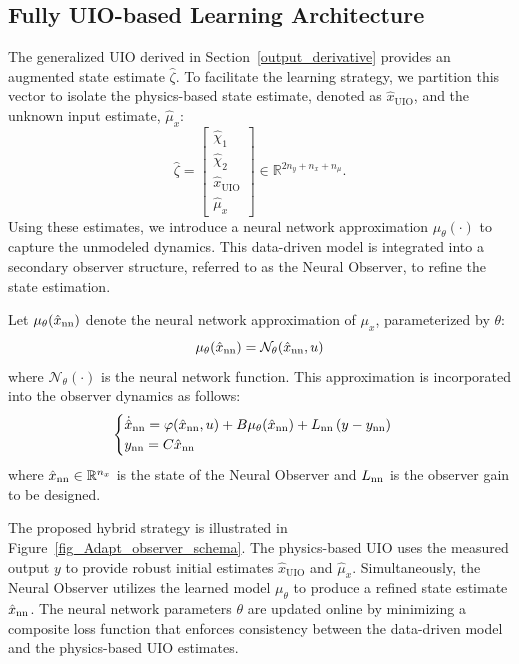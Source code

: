 \subsection{Fully UIO-based Learning Architecture}\label{learning_uio}
The generalized UIO derived in Section~\ref{output_derivative} provides an augmented state estimate $\hat{\zeta}$. To facilitate the learning strategy, we partition this vector to isolate the physics-based state estimate, denoted as $\hat{x}_{\text{UIO}}$, and the unknown input estimate, $\hat{\mu}_x$:
\begin{equation}
    \hat{\zeta} = \begin{bmatrix} \hat{\chi}_1 \\ \hat{\chi}_2 \\ \hat{x}_{\text{UIO}} \\ \hat{\mu}_x \end{bmatrix} \in \mathbb{R}^{2n_y + n_x + n_\mu}.
\end{equation}
Using these estimates, we introduce a neural network approximation $\mu_{\theta}(\cdot)$ to capture the unmodeled dynamics. This data-driven model is integrated into a secondary observer structure, referred to as the Neural Observer, to refine the state estimation.

Let $\mu_{\theta}(\hat{x}_{\text{nn}})$ denote the neural network approximation of $\mu_{x}$, parameterized by $\theta$:
\begin{equation}\label{learning_uio_e1}
\mu_{\theta}(\hat{x}_{\text{nn}}) = \mathcal{N}_{\theta} (\hat{x}_{\text{nn}}, u)
\end{equation}
where $\mathcal{N}_{\theta}(\cdot)$ is the neural network function. This approximation is incorporated into the observer dynamics as follows:
\begin{equation}\label{learning_uio_e2}
    \begin{cases}
        \dot{\hat{x}}_{\text{nn}} = \varphi(\hat{x}_{\text{nn}},u) + B \mu_{\theta}(\hat{x}_{\text{nn}}) + L_{\text{nn}} \left( y - y_{\text{nn}} \right) \\
        y_{\text{nn}} = C \hat{x}_{\text{nn}}
    \end{cases}
\end{equation}
where $\hat{x}_{\text{nn}}\in \mathbb{R}^{n_x}$ is the state of the Neural Observer and $L_{\text{nn}}$ is the observer gain to be designed.

The proposed hybrid strategy is illustrated in Figure~\ref{fig_Adapt_observer_schema}. The physics-based UIO uses the measured output $y$ to provide robust initial estimates $\hat{x}_{\text{UIO}}$ and $\hat{\mu}_{x}$. Simultaneously, the Neural Observer utilizes the learned model $\mu_{\theta}$ to produce a refined state estimate $\hat{x}_{\text{nn}}$. The neural network parameters $\theta$ are updated online by minimizing a composite loss function that enforces consistency between the data-driven model and the physics-based UIO estimates.

